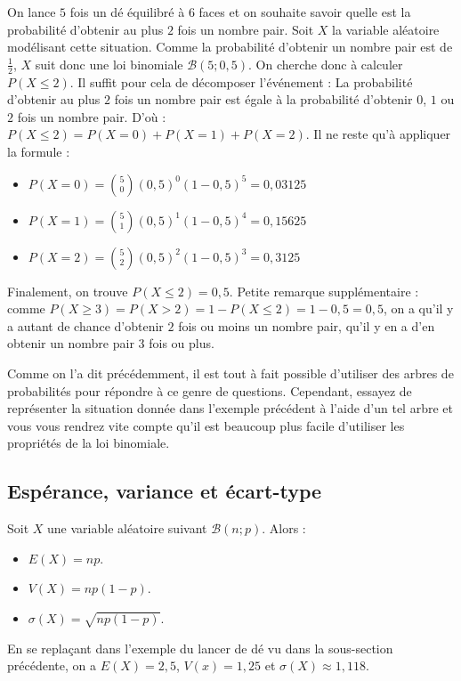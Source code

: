 	\begin{tip}[Exemple]
		On lance $5$ fois un dé équilibré à $6$ faces et on souhaite savoir quelle est la probabilité d'obtenir au plus $2$ fois un nombre pair.
		\newpar
		Soit $X$ la variable aléatoire modélisant cette situation. Comme la probabilité d'obtenir un nombre pair est de $\frac{1}{2}$, $X$ suit donc une loi binomiale $\mathcal{B}(5; 0,5)$.
		\newpar
		On cherche donc à calculer $P(X \leq 2)$. Il suffit pour cela de décomposer l'événement :
		\newpar
		La probabilité d'obtenir au plus $2$ fois un nombre pair est égale à la probabilité d'obtenir $0$, $1$ ou $2$ fois un nombre pair. D'où :
		\newpar
		$P(X \leq 2) = P(X = 0) + P(X = 1) + P(X = 2)$.
		\newpar
		Il ne reste qu'à appliquer la formule :
		\begin{itemize}
			\item $\displaystyle{P(X = 0) = \binom{5}{0}(0,5)^0(1-0,5)^5 = 0,03125}$
			\item $\displaystyle{P(X = 1) = \binom{5}{1}(0,5)^1(1-0,5)^4 = 0,15625}$
			\item $\displaystyle{P(X = 2) = \binom{5}{2}(0,5)^2(1-0,5)^3 = 0,3125}$
		\end{itemize}
		Finalement, on trouve $P(X \leq 2) = 0,5$.
		\newpar
		Petite remarque supplémentaire : comme $P(X \geq 3) = P(X \gt 2) = 1 - P(X \leq 2) = 1 - 0,5 = 0,5$, on a qu'il y a autant de chance d'obtenir $2$ fois ou moins un nombre pair, qu'il y en a d'en obtenir un nombre pair $3$ fois ou plus.
	\end{tip}

	Comme on l'a dit précédemment, il est tout à fait possible d'utiliser des arbres de probabilités pour répondre à ce genre de questions. Cependant, essayez de représenter la situation donnée dans l'exemple précédent à l'aide d'un tel arbre et vous vous rendrez vite compte qu'il est beaucoup plus facile d'utiliser les propriétés de la loi binomiale.

	\subsection{Espérance, variance et écart-type}

	\begin{formula}
		Soit $X$ une variable aléatoire suivant $\mathcal{B}(n; p)$. Alors :
		\begin{itemize}
			\item $E(X) = np$.
			\item $V(X) = np(1-p)$.
			\item $\sigma(X) = \sqrt{np(1-p)}$.
		\end{itemize}
	\end{formula}

	\begin{tip}[Exemple]
		En se replaçant dans l'exemple du lancer de dé vu dans la sous-section précédente, on a $E(X) = 2,5$, $V(x) = 1,25$ et $\sigma(X) \approx 1,118$.
	\end{tip}

